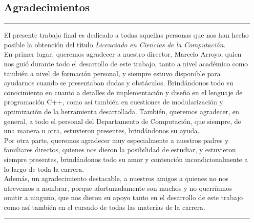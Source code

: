 \documentclass[a4paper,11pt]{ThesisStyle}
\begin{document}
\begin{vcenterpage}

\section*{Agradecimientos}
\noindent\rule[2pt]{\textwidth}{0.5pt}

El presente trabajo final es dedicado a todas aquellas personas que nos han hecho posible la obtención del título \textit{Licenciado en Ciencias de la Computación}.\\

En primer lugar, queremos agradecer a nuestro director, Marcelo Arroyo, quien nos guió durante todo el desarrollo de este trabajo, tanto a nivel académico como también a nivel de formación personal, y siempre estuvo disponible para ayudarnos cuando se presentaban dudas y obstáculos. Brindándonos todo su conocimiento en cuanto a detalles de implementación y diseño en el lenguaje de programación C++, como así también en cuestiones de modularización y optimización de la herramienta desarrollada.
También, queremos agradecer, en general, a todo el personal del Departamento de Computación, que siempre, de una manera u otra, estuvieron presentes, brindándonos su ayuda.\\

Por otra parte, queremos agradecer muy especialmente a nuestros padres y familiares directos, quienes nos dieron la posibilidad de estudiar, y estuvieron siempre presentes, brindándonos todo su amor y contención incondicionalmente a lo largo de toda la carrera.\\ 

Además, un agradecimiento destacable, a nuestros amigos a quienes no nos atrevemos a nombrar, porque afortunadamente son muchos y no querríamos omitir a ninguno, que nos dieron su apoyo tanto en el desarrollo de este trabajo como así también en el cursado de todas las materias de la carrera. 
\noindent\rule[2pt]{\textwidth}{0.5pt}
\end{vcenterpage}

\cleardoublepage

\tableofcontents
\dominitoc

\mainmatter

\appendix
\addappheadtotoc
\appendixpage


\listoffigures
\listoftables
\listofalgorithms
{}

% 
% 



\end{document}
